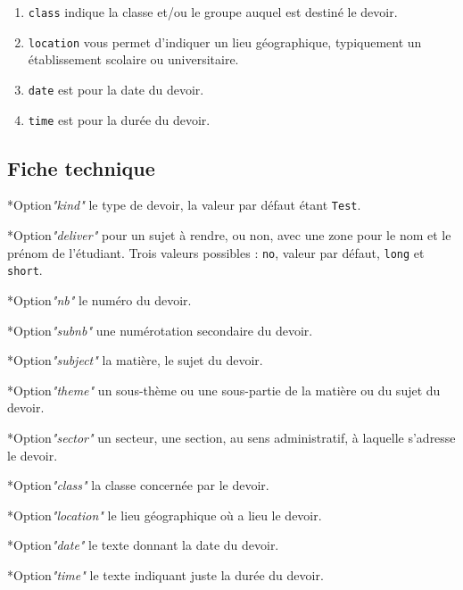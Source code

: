 \documentclass[12pt,a4paper]{scrartcl}
\makeatletter
\theoremstyle{definition}
\newcommand\IDmacro{\@ifstar{\@IDmacroStar}{\@IDmacroNoStar}}
\newcommand\@IDmacroNoStar[3]{%
    \texttt{%
    	\textbackslash#1%
    	\IfStrEq{#2}{0}{}{%
    		\,\,[#2 Option%
			\IfStrEq{#2}{1}{}{s}]%
		}%
	    \IfStrEq{#3}{}{}{%
    		\,\,(#3 Argument%
			\IfStrEq{#3}{1}{}{s})%
		}
   	}
    \immediate\write\tempfile{macro@#1@#2@#3}%
}
\newcommand\@IDmacroStar[2]{%
    \@IDmacroNoStar{#1}{0}{#2}%
}
\newcommand\@IDoptarg{\@ifstar{\@IDoptargStar}{\@IDoptargNoStar}}
\newcommand\@IDoptargStar[2]{%
	\vspace{0.5em}
	--- \texttt{#1%
		\IfStrEq{#2}{}{:}{\,#2:}%
	}%
}
\newcommand\@IDoptargNoStar[2]{%
	\IfStrEq{#2}{}{%
		\@IDoptargStar{#1}{}%
	}{%
		\@IDoptargStar{#1}{\##2}%
	}%
}
\newcommand\IDkey[1]{%
	\@IDoptarg*{Option}{{\itshape "#1"}}%
}
\makeatother
\begin{document}
\begin{enumerate}
    \item \verb+class+ indique la classe et/ou le groupe auquel est destiné le devoir.

    \item \verb+location+ vous permet d'indiquer un lieu géographique, typiquement un établissement scolaire ou universitaire.

    \item \verb+date+ est pour la date du devoir.

    \item \verb+time+ est pour la durée du devoir.
\end{enumerate}


%


    \subsection{Fiche technique}

\IDmacro{exam}{11}{}

\IDkey{kind} le type de devoir, la valeur par défaut étant \verb+Test+.

\IDkey{deliver} pour un sujet à rendre, ou non, avec une zone pour le nom et le prénom de l'étudiant. Trois valeurs possibles : \verb+no+, valeur par défaut, \verb+long+ et \verb+short+.

\IDkey{nb} le numéro du devoir.

\IDkey{subnb} une numérotation secondaire du devoir.

\IDkey{subject} la matière, le sujet du devoir.

\IDkey{theme} un sous-thème ou une sous-partie de la matière ou du sujet du devoir.

\IDkey{sector} un secteur, une section, au sens administratif, à laquelle s'adresse le devoir.

\IDkey{class} la classe concernée par le devoir.

\IDkey{location} le lieu géographique où a lieu le devoir.

\IDkey{date} le texte donnant la date du devoir.

\IDkey{time} le texte indiquant juste la durée du devoir.
\end{document}
